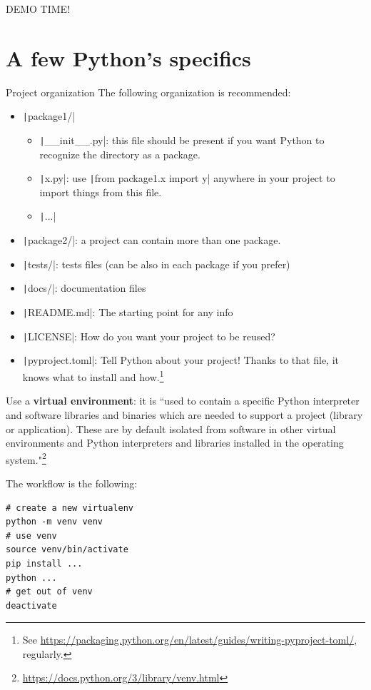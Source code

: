 \documentclass[10pt,
aspectratio=169
]{beamer}
\begin{document}
\begin{frame}
\begin{center}
	{\LARGE DEMO TIME!}
\end{center}
\end{frame}

 \section{A few Python's specifics}
 
 \begin{frame}{Project organization}
 	The following organization is recommended:\begin{itemize}
 		\item \texttt|package1/|\begin{itemize}
 			\item \texttt|__init__.py|: this file should be present if you want Python to recognize the directory as a package.
 			\item \texttt|x.py|: use  \texttt|from package1.x import y| anywhere in your project to import things from this file.
 			\item \texttt|...|
 		\end{itemize}
 		\item \texttt|package2/|: a project can contain more than one package.
 		\item \texttt|tests/|: tests files (can be also in each package if you prefer)
 		\item \texttt|docs/|: documentation files
 		\item \texttt|README.md|: The starting point for any info
 		\item \texttt|LICENSE|: How do you want your project to be reused?
 		\item \texttt|pyproject.toml|: Tell Python about your project! Thanks to that file, it knows what to install and how.\footnote{See \url{https://packaging.python.org/en/latest/guides/writing-pyproject-toml/}, regularly.}
 	\end{itemize}
 	\vspace{1em}
 \end{frame}
 
 \begin{frame}[fragile]
 Use a \textbf{virtual environment}: it is ``used to contain a specific Python interpreter and software libraries and binaries which are needed to support a project (library or application). These are by default isolated from software in other virtual environments and Python interpreters and libraries installed in the operating system."\footnote{\url{https://docs.python.org/3/library/venv.html}}
 
 The workflow is the following:\begin{verbatim}
# create a new virtualenv
python -m venv venv
# use venv
source venv/bin/activate
pip install ...
python ...
# get out of venv
deactivate
 \end{verbatim}
 \end{frame}
 
\end{document}
